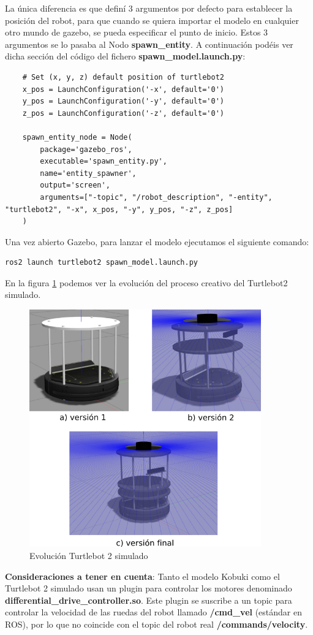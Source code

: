 La única diferencia es que definí 3 argumentos por defecto para establecer la posición del robot, para que cuando se quiera importar el modelo en cualquier otro mundo de gazebo, se pueda especificar el punto de inicio. Estos 3 argumentos se lo pasaba al Nodo \textbf{spawn\_entity}. A continuación podéis ver dicha sección del código del fichero \textbf{spawn\_model.launch.py}:
\begin{lstlisting}
	# Set (x, y, z) default position of turtlebot2
	x_pos = LaunchConfiguration('-x', default='0')
	y_pos = LaunchConfiguration('-y', default='0')
	z_pos = LaunchConfiguration('-z', default='0')
	
	spawn_entity_node = Node(
		package='gazebo_ros',
		executable='spawn_entity.py',
		name='entity_spawner',
		output='screen',
		arguments=["-topic", "/robot_description", "-entity", "turtlebot2", "-x", x_pos, "-y", y_pos, "-z", z_pos]
	)
\end{lstlisting}

Una vez abierto Gazebo, para lanzar el modelo ejecutamos el siguiente comando:
\begin{lstlisting}
ros2 launch turtlebot2 spawn_model.launch.py
\end{lstlisting}

En la figura \ref{fig:evolucion_turtlebot2_sim} podemos ver la evolución del proceso creativo del Turtlebot2 simulado.
\begin{figure} [H]
  \begin{center}
    \includegraphics[width=10cm]{imagenes/creacion-turtlebot2-sim.png}
  \end{center}
  \caption[Evolución Turtlebot 2 simulado]{Evolución Turtlebot 2 simulado}
  \label{fig:evolucion_turtlebot2_sim}
\end{figure}


\textbf{Consideraciones a tener en cuenta}: Tanto el modelo Kobuki como el Turtlebot 2 simulado usan un plugin para controlar los motores denominado \textbf{differential\_drive\_controller.so}. Este plugin se suscribe a un topic para controlar la velocidad de las ruedas del robot llamado \textbf{/cmd\_vel} (estándar en ROS), por lo que no coincide con el topic del robot real \textbf{/commands/velocity}. 


